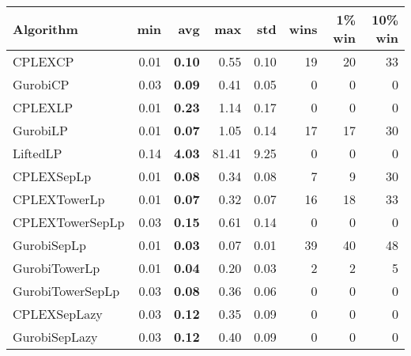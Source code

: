 \begin{tabular}{lrrrrrrr}
Algorithm & min & avg & max & std
& wins & 1\% win & 10\% win 
\\
\hline
CPLEXCP&0.01& \bf0.10& 0.55& 0.10&19&20&33\\
GurobiCP&0.03& \bf0.09& 0.41& 0.05&0&0&0\\
CPLEXLP&0.01& \bf0.23& 1.14& 0.17&0&0&0\\
GurobiLP&0.01& \bf0.07& 1.05& 0.14&17&17&30\\
LiftedLP&0.14& \bf4.03& 81.41& 9.25&0&0&0\\
CPLEXSepLp&0.01& \bf0.08& 0.34& 0.08&7&9&30\\
CPLEXTowerLp&0.01& \bf0.07& 0.32& 0.07&16&18&33\\
CPLEXTowerSepLp&0.03& \bf0.15& 0.61& 0.14&0&0&0\\
GurobiSepLp&0.01& \bf0.03& 0.07& 0.01&39&40&48\\
GurobiTowerLp&0.01& \bf0.04& 0.20& 0.03&2&2&5\\
GurobiTowerSepLp&0.03& \bf0.08& 0.36& 0.06&0&0&0\\
CPLEXSepLazy&0.03& \bf0.12& 0.35& 0.09&0&0&0\\
GurobiSepLazy&0.03& \bf0.12& 0.40& 0.09&0&0&0
\end{tabular}
